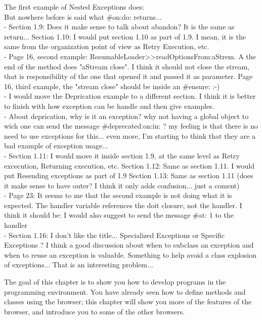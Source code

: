 \documentclass[a4paper,10pt,twoside]{book}
\begin{document}
{The first example of Nested Exceptions does:
\ct{result := [[ Error signal ....]}\\
But nowhere before is said what \#on:do: returns...  \\
- Section 1.9: Does it make sense to talk about abandon? It is the same as return... 
Section 1.10: I would put section 1.10 as part of 1.9. I mean, it is the same from the organization point of view as Retry Execution, etc. \\
- Page 16, second example: ResumableLoader>>readOptionsFrom:aStrem. A the end of the method does "aStream close". I think it should not close the stream, that is responsibility of the one that opened it and passed it as parameter.
Page 16, third example, the "stream close" should be inside an \#ensure: :-) \\
- I would move the Deprication example to a different section. I think it is better to finish with how exception can be handle and then give examples. \\
- About deprication, why is it an exception? why not having a global object to wich one can send the message \#deprecated:on:in: ? my feeling is that there is no need to use exceptions for this... even more, I'm starting to think that they are a bad example of exception usage... \\
- Section 1.11: I would move it inside section 1.9, at the same level as Retry excecution, Returning execution, etc.
Section 1.12: Same as section 1.11. I would put Resending exceptions as part of 1.9
Section 1.13: Same as section 1.11 (does it make sense to have outer? I think it only adds confusion... just a coment) \\
- Page 23: It seems to me that the second example is not doing what it is expected. The handler variable references the doit closure, not the handler. I think it should be:
I would also suggest to send the message \#at: 1 to the handler \\
- Section 1.16: I don't like the title... Specialized Exceptions or Specific Exceptions ?
I think a good discussion about when to subclass an exception and when to reuse an exception is valuable. Something to help avoid a class explosion of exceptions... That is an interesting problem... \\
}

The goal of this chapter is to show you how to develop programs in the \pharo programming environment.
You have already seen how to define methods and classes using the browser; this chapter will show you more of the features of the browser, and introduce you to some of the other browsers.
\end{document}
